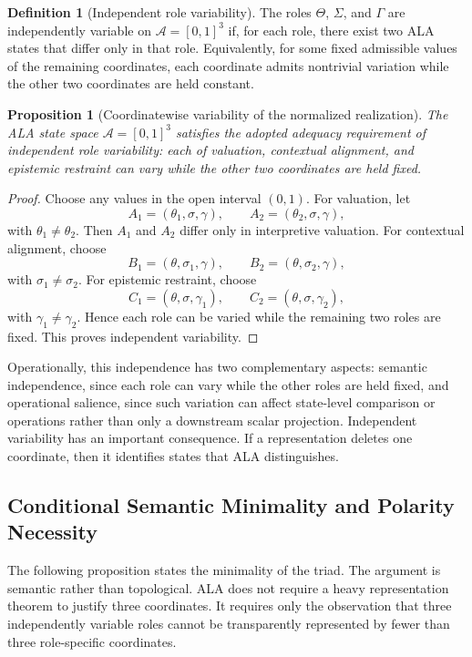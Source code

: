 \documentclass[reqno,final]{amsart}
\theoremstyle{definition}
\newtheorem{definition}{Definition}
\theoremstyle{plain}
\newtheorem{proposition}{Proposition}
\theoremstyle{remark}
\providecommand{\cA}{\mathcal{A}}
\begin{document}
\begin{definition}[Independent role variability]
The roles \(\Theta\), \(\Sigma\), and \(\Gamma\) are independently variable on \(\cA=[0,1]^3\) if, for each role, there exist two ALA states that differ only in that role. Equivalently, for some fixed admissible values of the remaining coordinates, each coordinate admits nontrivial variation while the other two coordinates are held constant.
\end{definition}

\begin{proposition}[Coordinatewise variability of the normalized realization]
\label{prop:coordinatewise-independent-variability}
The ALA state space \(\cA=[0,1]^3\) satisfies the adopted adequacy requirement of independent role variability: each of valuation, contextual alignment, and epistemic restraint can vary while the other two coordinates are held fixed.
\end{proposition}

\begin{proof}
Choose any values in the open interval \((0,1)\). For valuation, let
\[
A_1=(\theta_1,\sigma,\gamma),\qquad
A_2=(\theta_2,\sigma,\gamma),
\]
with \(\theta_1\ne\theta_2\). Then \(A_1\) and \(A_2\) differ only in interpretive valuation. For contextual alignment, choose
\[
B_1=(\theta,\sigma_1,\gamma),\qquad
B_2=(\theta,\sigma_2,\gamma),
\]
with \(\sigma_1\ne\sigma_2\). For epistemic restraint, choose
\[
C_1=(\theta,\sigma,\gamma_1),\qquad
C_2=(\theta,\sigma,\gamma_2),
\]
with \(\gamma_1\ne\gamma_2\). Hence each role can be varied while the remaining two roles are fixed. This proves independent variability. 
\end{proof} 

Operationally, this independence has two complementary aspects: semantic independence, since each role can vary while the other roles are held fixed, and operational salience, since such variation can affect state-level comparison or operations rather than only a downstream scalar projection. Independent variability has an important consequence. If a representation deletes one coordinate, then it identifies states that ALA distinguishes.

\subsection{Conditional Semantic Minimality and Polarity Necessity}
\label{subsec:semantic-minimality}

The following proposition states the minimality of the triad. The argument is semantic rather than topological. ALA does not require a heavy representation theorem to justify three coordinates. It requires only the observation that three independently variable roles cannot be transparently represented by fewer than three role-specific coordinates.
\end{document}
